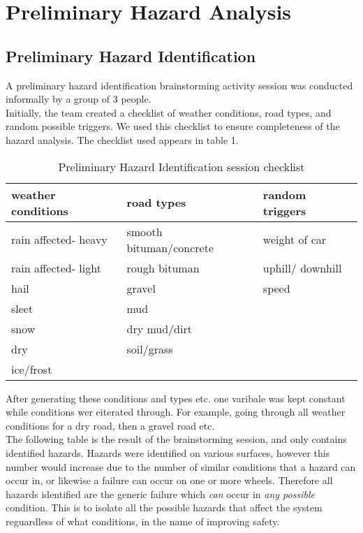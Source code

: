 \documentclass{article}
\begin{document}
\newpage
\section{Preliminary Hazard Analysis}

\subsection{Preliminary Hazard Identification}
\noindent
A preliminary hazard identification brainstorming activity session was 
conducted informally by a group of 3 people.\\
Initially, the team created a checklist of weather conditions, road types,
and random possible triggers.  We used this checklist to ensure completeness
of the hazard analysis.  The checklist used appears in table 1.\\

\begin{table}[h!tbp]
\begin{center}
\begin{tabular}{|l|l|l|}
\hline
\textbf{weather conditions}	&	\textbf{road types}	& \textbf{random triggers}\\
\hline
rain affected- heavy&	smooth bituman/concrete&	weight of car\\
rain affected- light&	rough bituman&		uphill/ downhill\\
hail&	gravel	&	speed\\
sleet&	mud&\\
snow& 	dry mud/dirt&\\
dry&	soil/grass&\\
ice/frost&	&\\
\hline
\end{tabular}
\end{center}
\caption{Preliminary Hazard Identification session checklist}
\label{fig:PHIChecklist}
\end{table}



\noindent
After generating these conditions and types etc. one varibale was kept constant
while conditions wer eiterated through.  For example, going through all 
weather conditions for a dry road, then a gravel road etc.\\

\noindent
The following table is the result of the brainstorming session, and only 
contains identified hazards.  Hazards were identified on various surfaces,
however this number would increase due to the number of similar conditions that
a hazard can occur in, or likewise a failure can occur on one or more wheels.
Therefore all hazards identified are the generic failure which \emph{can} occur in
\emph{any possible} condition.  This is to isolate all the possible hazards that
affect the system reguardless of what conditions, in the name of improving safety.\\
\end{document}
